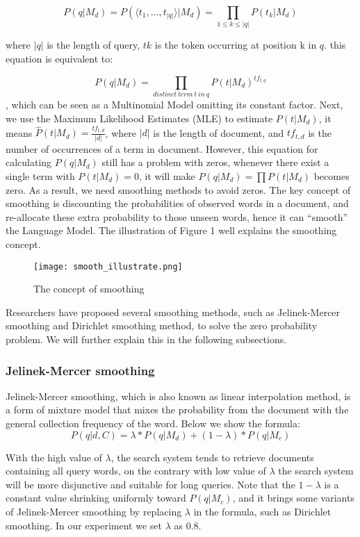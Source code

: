 \documentclass{article}
\begin{document}
$$P(q | M_d) = P(\langle t_1, \ldots, t_{\left|q\right|} \rangle|M_d) = \prod_{1\leq k \leq \left|q\right|} P(t_k|M_d)$$

where $\left|q\right|$ is the length of query, $tk$ is the token occurring at position k in $q$. this equation is
equivalent to:

$$P(q|M_d) = \prod_{distinct\ term\ t\ in\ q} P(t|M_d)^{tf_{t,q}}$$
, which can be seen as a Multinomial Model omitting its constant factor. Next, we use the
Maximum Likelihood Estimates (MLE) to estimate $P(t|M_d)$, it means $\hat{P}(t|M_d) = \frac{tf_{t,d}}{\left|d\right|}$, where $\left|d\right|$ is the length of document, and $tf_{t,d}$ is the number of occurrences of a term in document. However, this equation for calculating $P(q | M_d)$ still has a problem with zeros, whenever there exist a single term with $P(t|M_d) = 0$, it will make $P(q|M_d) = \prod P(t|M_d)$ becomes zero. As a result, we need smoothing methods to avoid zeros. The key concept of smoothing is discounting the probabilities of observed words in a document, and re-allocate these extra probability to those unseen words, hence it can “smooth” the Language Model. The illustration of Figure 1 well explains the smoothing concept.

\begin{figure}[htp]
    \centering
    \texttt{[image: smooth\_illustrate.png]}
    \caption{The concept of smoothing}
\end{figure}

Researchers have proposed several smoothing methods, such as Jelinek-Mercer smoothing
and Dirichlet smoothing method, to solve the zero probability problem. We will further explain
this in the following subsections.

\subsubsection{Jelinek-Mercer smoothing}
Jelinek-Mercer smoothing, which is also known as linear interpolation method, is a form of mixture model that mixes the probability from the document with the general collection frequency of the word. Below we show the formula:
$$P(q|d,C) = \lambda * P(q|M_d) + (1-\lambda)*P(q|M_c)$$

With the high value of $\lambda$, the search system tends to retrieve documents containing all query
words, on the contrary with low value of $\lambda$ the search system will be more disjunctive and
suitable for long queries. Note that the $1-\lambda$ is a constant value shrinking uniformly toward
$P(q|M_c)$, and it brings some variants of Jelinek-Mercer smoothing by replacing $\lambda$ in the
formula, such as Dirichlet smoothing. In our experiment we set $\lambda$ as 0.8.
\end{document}
